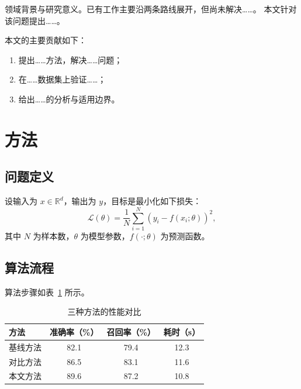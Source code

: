 \documentclass[UTF8,a4paper,zihao=-4]{ctexart}
\begin{document}
领域背景与研究意义\cite{ref1}。已有工作主要沿两条路线展开\cite{ref2,ref3}，但尚未解决\ldots\ldots。
本文针对该问题提出\ldots\ldots。

本文的主要贡献如下：
\begin{enumerate}
  \item 提出\ldots\ldots 方法，解决\ldots\ldots 问题；
  \item 在\ldots\ldots 数据集上验证\ldots\ldots；
  \item 给出\ldots\ldots 的分析与适用边界。
\end{enumerate}

\section{方法}
\label{sec:method}

\subsection{问题定义}

设输入为 $x \in \mathbb{R}^{d}$，输出为 $y$，目标是最小化如下损失：
\begin{equation}
  \mathcal{L}(\theta) = \frac{1}{N}\sum_{i=1}^{N}\left(y_i - f(x_i;\theta)\right)^2 ,
  \label{eq:loss}
\end{equation}
其中 $N$ 为样本数，$\theta$ 为模型参数，$f(\cdot;\theta)$ 为预测函数。

\subsection{算法流程}

算法步骤如表~\ref{tab:example} 所示。

\begin{table}[htbp]
  \centering
  \caption{三种方法的性能对比}
  \label{tab:example}
  \begin{tabular}{lccc}
    \toprule
    方法 & 准确率（\%） & 召回率（\%） & 耗时（s） \\
    \midrule
    基线方法 & 82.1 & 79.4 & 12.3 \\
    对比方法 & 86.5 & 83.1 & 11.6 \\
    本文方法 & 89.6 & 87.2 & 10.8 \\
    \bottomrule
  \end{tabular}
\end{table}
\end{document}
